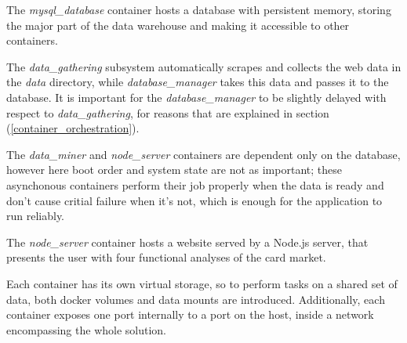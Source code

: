 The \textit{mysql\_database} container hosts a database with persistent memory, storing the major part of the data warehouse and making it accessible to other containers.

The \textit{data\_gathering} subsystem automatically scrapes and collects the web data in the \textit{data} directory, while \textit{database\_manager} takes this data and passes it to the database. It is important for the \textit{database\_manager} to be slightly delayed with respect to \textit{data\_gathering}, for reasons that are explained in section (\ref{container_orchestration}).

The \textit{data\_miner} and \textit{node\_server} containers are dependent only on the database, however here boot order and system state are not as important; these asynchonous containers perform their job properly when the data is ready and don't cause critial failure when it's not, which is enough for the application to run reliably.

The \textit{node\_server} container hosts a website served by a Node.js server, that presents the user with four functional analyses of the card market.

Each container has its own virtual storage, so to perform tasks on a shared set of data, both docker volumes and data mounts are introduced. Additionally, each container exposes one port internally to a port on the host, inside a network encompassing the whole solution.
